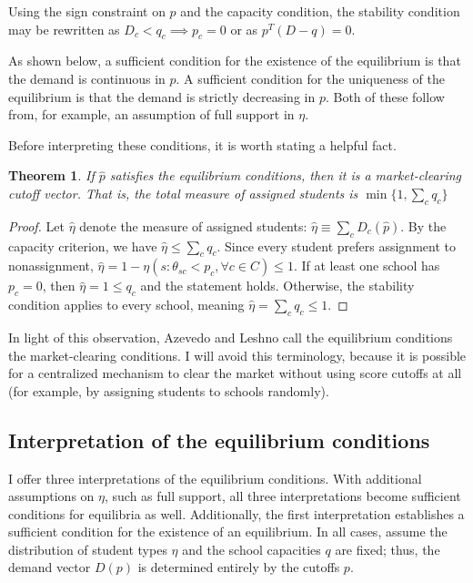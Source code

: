 \documentclass[12pt]{article}
\numberwithin{equation}{subsection}
\newtheorem{theorem}{Theorem}
\theoremstyle{definition}
\begin{document}
Using the sign constraint on $p$ and the capacity condition, the stability condition may be rewritten as $D_c < q_c \implies p_c = 0$ or as $p^T \left(D - q\right) = 0$.

As shown below, a sufficient condition for the existence of the equilibrium is that the demand is continuous in $p$. A sufficient condition for the uniqueness of the equilibrium is that the demand is strictly decreasing in $p$. Both of these follow from, for example, an assumption of full support in $\eta$. 

Before interpreting these conditions, it is worth stating a helpful fact. 

\begin{theorem}If $\hat p$ satisfies the equilibrium conditions, then it is a market-clearing cutoff vector. That is, the total measure of assigned students is $\min\{1, \sum_c q_c\}$
\end{theorem}

\begin{proof}Let $\hat \eta$ denote the measure of assigned students: $\hat \eta \equiv \sum_c D_c(\hat p)$. By the capacity criterion, we have $\hat \eta \leq \sum_c q_c$. Since every student prefers assignment to nonassignment, $\hat \eta = 1 - \eta ( s: \theta_{sc} < p_c, \forall c \in C) \leq 1$. If at least one school has $p_c = 0$, then $\hat \eta = 1 \leq q_c$ and the statement holds. Otherwise, the stability condition applies to every school, meaning $\hat \eta = \sum_c q_c \leq 1$. \end{proof}

In light of this observation, Azevedo and Leshno \parencite*{supplydemandfw} call the equilibrium conditions the market-clearing conditions. I will avoid this terminology, because it is possible for a centralized mechanism to clear the market without using score cutoffs at all (for example, by assigning students to schools randomly). 

\subsection{Interpretation of the equilibrium conditions}
I offer three interpretations of the equilibrium conditions. With additional assumptions on $\eta$, such as full support, all three interpretations become sufficient conditions for equilibria as well. Additionally, the first interpretation establishes a sufficient condition for the existence of an equilibrium. In all cases, assume the distribution of student types $\eta$ and the school capacities $q$ are fixed; thus, the demand vector $D(p)$ is determined entirely by the cutoffs $p$. 
\end{document}
